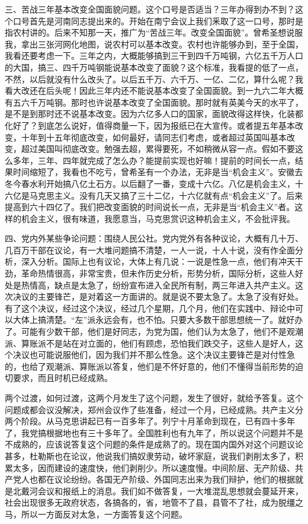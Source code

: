 三、苦战三年基本改变全国面貌问题。这个口号是否适当？三年办得到办不到？这个口号首先是河南同志提出来的。开始在南宁会议上我们釆取了这一口号，那时是指农村讲的。后来不知那一天，推广为“苦战三年。改变全国面貌”。曾希圣想说服我，拿出三张河网化地图，说农村可以基本改变。农村也许能够办到，至于全国，我看还要考虑一下。三年之内，大概能够搞到三干到四千万吨钢，六亿五千万人口的大国，搞三、四千万吨钢能说基本改变了面貌？这个标准，我看提的低了一点，不然，以后就没有什么改头了。以后五千万、六千万、一亿、二亿，算什么呢？我看大改还在后头呢！因此三年内还不能说基本改变了全国面貌。到一九六二年大概有五六千万吨钢。那时也许说基本改变了全国面貌。那时就有英美今天的水平了，是不是到那时还不说基本改变。因为六亿多人口的国家，面貌改得这样快，化装都化好了？到底怎么说好，值得商量一下，因为报纸已在大宣传。或者提五年基本改变，十年到十五年彻底改变，如何最好，请同志们考虑，或者超过英国叫基本改变，超过美国叫彻底改变。勉强去超，累得要死，不如稍微从容一点。假如不要这么多年，三年、四年就完成了怎么办？能提前实现也好嘛！提前的时间长一点，结果时间缩短了，我看也不吃亏，曾希圣有一个办法，无非是当“机会主义”。安徽去冬今春水利开始搞八亿土石方。以后翻了一番，变成十六亿。八亿是机会主义，十六亿是马克思主义。没有几天又搞了三十二亿，十六亿就有点“机会主义”了。后来提高到六十四亿了。我们把改变面貌的时间说长一点，无非是当“机会主义”者。这样的机会主义，很有味道，我愿意当，马克思赏识这种机会主义，不会批评我。

四、党内外某些争论问题：围绕人民公社。党内党外有各种议论，大概有几十万、几百万干部在议论，有一大堆问题搞不清楚，一人一说，十人十说，没有作全面分析，深入分析。国际上也有议论，大体上有几说：一说是性急一点，他们有冲天干劲，革命热情很高，非常宝贵，但未作历史分析，形势分析，国际分析，这些人好处是热情高，缺点是太急了，纷纷宣布进入全民所有制，两三年进入共产主义。这次决议的主要锋芒，是对着这一方面讲的。就是说不要太急了。太急了没有好处。有了这个决议，经过这个决议，经过几个星期，几个月，他们在实践中、辩论中可以大体上搞清楚。“左”派永远会有，也不怕。只要大多数干部思想统一了。就好办了。可能有少数干部，他们是好同志，为党为国，他们认为太急了，他们不是观潮派、算账派不是站在对立面的，他们有顾虑，恐怕我们跌交子，这些人是好人，这个决议也可能说服他们，因为我们并不那么性急。这个决议主要锋芒是对付性急的，也给了观潮派、算账派以答复，他们是不怀好意的，他们不懂得当前形势的迫切要求，而且时机已经成熟。

两个过渡，如何过渡，这两个月发生了这个问题，发生了很好，就给予答复。这个问题成都会议没解决，郑州会议作了些准备，经过一个月，已经成熟。共产主义分两个阶段。从马克思讲起已有一百多年了。列宁十月革命到现在，已有四十多年了，我党搞根据地也有三十多年了。全国胜利也有九年了，所以说这个问题并不是不成熟的，应该说答复这个问题的条件是成熟了的。现在国内国外对这个问题议论甚多，杜勒斯也在论议，他说我们搞奴隶劳动，破坏家庭，说我们剥削太多了，积累太多，因而建设的速度快，他们剥削少。所以速度慢。中间阶层、无产阶级、共产党人也都在议论纷纷。各国无产阶级、外国同志出来为我们辩护，他们的根据就是北戴河会议和报纸上的消息。我们如不做答复，一大堆混乱思想就会蔓延开来，社会出现很多无政府状态，各搞各的，省，地管不了县，县管不了社，成为脱缰之马，所以一方面反对太急，一方面答复这个问题。

